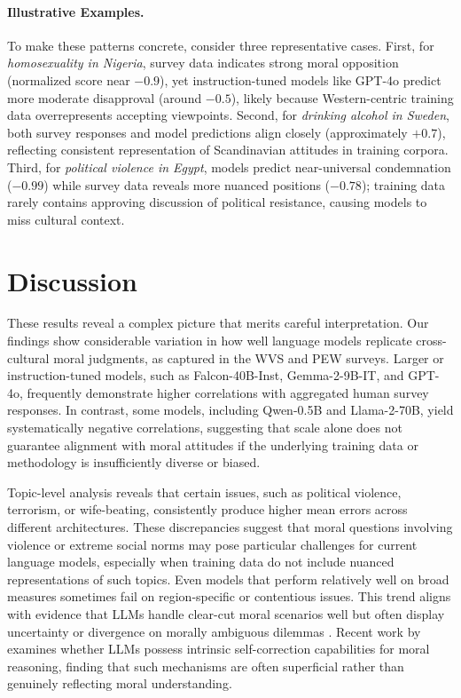 \documentclass[a4paper,10pt,twoside]{article}
\begin{document}
\paragraph{Illustrative Examples.}
To make these patterns concrete, consider three representative cases. First, for \emph{homosexuality in Nigeria}, survey data indicates strong moral opposition (normalized score near $-0.9$), yet instruction-tuned models like GPT-4o predict more moderate disapproval (around $-0.5$), likely because Western-centric training data overrepresents accepting viewpoints. Second, for \emph{drinking alcohol in Sweden}, both survey responses and model predictions align closely (approximately $+0.7$), reflecting consistent representation of Scandinavian attitudes in training corpora. Third, for \emph{political violence in Egypt}, models predict near-universal condemnation ($-0.99$) while survey data reveals more nuanced positions ($-0.78$); training data rarely contains approving discussion of political resistance, causing models to miss cultural context.

\section{Discussion}

These results reveal a complex picture that merits careful interpretation. Our findings show considerable variation in how well language models replicate cross-cultural moral judgments, as captured in the WVS and PEW surveys. Larger or instruction-tuned models, such as Falcon-40B-Inst, Gemma-2-9B-IT, and GPT-4o, frequently demonstrate higher correlations with aggregated human survey responses. In contrast, some models, including Qwen-0.5B and Llama-2-70B, yield systematically negative correlations, suggesting that scale alone does not guarantee alignment with moral attitudes if the underlying training data or methodology is insufficiently diverse or biased.

Topic-level analysis reveals that certain issues, such as political violence, terrorism, or wife-beating, consistently produce higher mean errors across different architectures. These discrepancies suggest that moral questions involving violence or extreme social norms may pose particular challenges for current language models, especially when training data do not include nuanced representations of such topics. Even models that perform relatively well on broad measures sometimes fail on region-specific or contentious issues. This trend aligns with evidence that LLMs handle clear-cut moral scenarios well but often display uncertainty or divergence on morally ambiguous dilemmas \cite{scherrer2023evaluating}. Recent work by  examines whether LLMs possess intrinsic self-correction capabilities for moral reasoning, finding that such mechanisms are often superficial rather than genuinely reflecting moral understanding.
\end{document}
